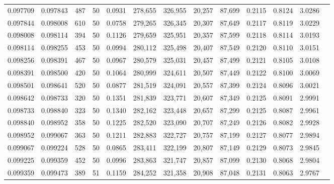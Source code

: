 \begin{tabular}{rrrrrrrrrrrrr}
0.097709 & 0.097843 &   487 &  50 &                                     0.0931 & 278,655 & 326,955 &  20,257 &  87,699 & 0.2115 & 0.8124 & 3.0286 \\
0.097844 & 0.098008 &   610 &  50 &                                     0.0758 & 279,265 & 326,345 &  20,307 &  87,649 & 0.2117 & 0.8119 & 3.0229 \\
0.098008 & 0.098114 &   394 &  50 &                                     0.1126 & 279,659 & 325,951 &  20,357 &  87,599 & 0.2118 & 0.8114 & 3.0193 \\
0.098114 & 0.098255 &   453 &  50 &                                     0.0994 & 280,112 & 325,498 &  20,407 &  87,549 & 0.2120 & 0.8110 & 3.0151 \\
0.098256 & 0.098391 &   467 &  50 &                                     0.0967 & 280,579 & 325,031 &  20,457 &  87,499 & 0.2121 & 0.8105 & 3.0108 \\
0.098391 & 0.098500 &   420 &  50 &                                     0.1064 & 280,999 & 324,611 &  20,507 &  87,449 & 0.2122 & 0.8100 & 3.0069 \\
0.098501 & 0.098641 &   520 &  50 &                                     0.0877 & 281,519 & 324,091 &  20,557 &  87,399 & 0.2124 & 0.8096 & 3.0021 \\
0.098642 & 0.098733 &   320 &  50 &                                     0.1351 & 281,839 & 323,771 &  20,607 &  87,349 & 0.2125 & 0.8091 & 2.9991 \\
0.098733 & 0.098840 &   323 &  50 &                                     0.1340 & 282,162 & 323,448 &  20,657 &  87,299 & 0.2125 & 0.8087 & 2.9961 \\
0.098840 & 0.098952 &   358 &  50 &                                     0.1225 & 282,520 & 323,090 &  20,707 &  87,249 & 0.2126 & 0.8082 & 2.9928 \\
0.098952 & 0.099067 &   363 &  50 &                                     0.1211 & 282,883 & 322,727 &  20,757 &  87,199 & 0.2127 & 0.8077 & 2.9894 \\
0.099067 & 0.099224 &   528 &  50 &                                     0.0865 & 283,411 & 322,199 &  20,807 &  87,149 & 0.2129 & 0.8073 & 2.9845 \\
0.099225 & 0.099359 &   452 &  50 &                                     0.0996 & 283,863 & 321,747 &  20,857 &  87,099 & 0.2130 & 0.8068 & 2.9804 \\
0.099359 & 0.099473 &   389 &  51 &                                     0.1159 & 284,252 & 321,358 &  20,908 &  87,048 & 0.2131 & 0.8063 & 2.9767 \\

\end{tabular}
